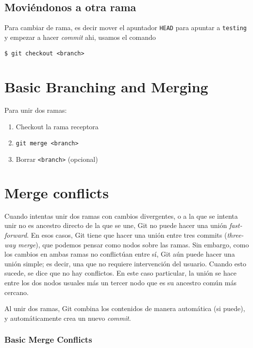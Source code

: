 \subsection{Moviéndonos a otra rama}

Para cambiar de rama, es decir mover el apuntador
\passthrough{\lstinline!HEAD!} para apuntar a
\passthrough{\lstinline!testing!} y empezar a hacer \emph{commit} ahi,
usamos el comando

\begin{lstlisting}
$ git checkout <branch>
\end{lstlisting}

\section{Basic Branching and Merging}

Para unir dos ramas:

\begin{enumerate}
\def\labelenumi{\arabic{enumi}.}
\tightlist
\item
  Checkout la rama receptora
\item
  \passthrough{\lstinline!git merge <branch>!}
\item
  Borrar \passthrough{\lstinline!<branch>!} (opcional)
\end{enumerate}

\section{Merge conflicts}

Cuando intentas unir dos ramas con cambios divergentes, o a la que se
intenta unir no es ancestro directo de la que se une, Git no puede hacer
una unión \emph{fast-forward}. En esos casos, Git tiene que hacer una
unión entre tres commits (\emph{three-way merge}), que podemos pensar
como nodos sobre las ramas. Sin embargo, como los cambios en ambas ramas
no conflictúan entre sí, Git aún puede hacer una unión simple; es decir,
una que no requiere intervención del usuario. Cuando esto sucede, se
dice que no hay conflictos. En este caso particular, la unión se hace
entre los dos nodos usuales más un tercer nodo que es su ancestro común
más cercano.

Al unir dos ramas, Git combina los contenidos de manera automática (si
puede), y automáticamente crea un nuevo \emph{commit}.

\subsubsection{Basic Merge Conflicts}

